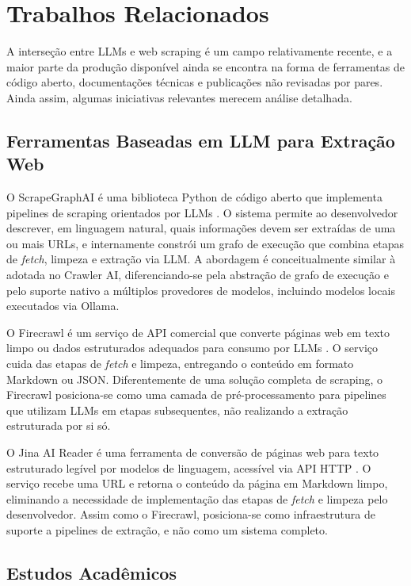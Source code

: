 \documentclass[tcc,capa]{texifsul}
\begin{document}
\section{Trabalhos Relacionados}

A interseção entre LLMs e web scraping é um campo relativamente recente, e a maior parte da produção disponível ainda se encontra na forma de ferramentas de código aberto, documentações técnicas e publicações não revisadas por pares. Ainda assim, algumas iniciativas relevantes merecem análise detalhada.

\subsection*{Ferramentas Baseadas em LLM para Extração Web}

O ScrapeGraphAI é uma biblioteca Python de código aberto que implementa pipelines de scraping orientados por LLMs \cite{ScrapeGraphAI2024}. O sistema permite ao desenvolvedor descrever, em linguagem natural, quais informações devem ser extraídas de uma ou mais URLs, e internamente constrói um grafo de execução que combina etapas de \textit{fetch}, limpeza e extração via LLM. A abordagem é conceitualmente similar à adotada no Crawler AI, diferenciando-se pela abstração de grafo de execução e pelo suporte nativo a múltiplos provedores de modelos, incluindo modelos locais executados via Ollama.

O Firecrawl é um serviço de API comercial que converte páginas web em texto limpo ou dados estruturados adequados para consumo por LLMs \cite{Firecrawl2024}. O serviço cuida das etapas de \textit{fetch} e limpeza, entregando o conteúdo em formato Markdown ou JSON. Diferentemente de uma solução completa de scraping, o Firecrawl posiciona-se como uma camada de pré-processamento para pipelines que utilizam LLMs em etapas subsequentes, não realizando a extração estruturada por si só.

O Jina AI Reader é uma ferramenta de conversão de páginas web para texto estruturado legível por modelos de linguagem, acessível via API HTTP \cite{JinaReader2024}. O serviço recebe uma URL e retorna o conteúdo da página em Markdown limpo, eliminando a necessidade de implementação das etapas de \textit{fetch} e limpeza pelo desenvolvedor. Assim como o Firecrawl, posiciona-se como infraestrutura de suporte a pipelines de extração, e não como um sistema completo.

\subsection*{Estudos Acadêmicos}
\end{document}
